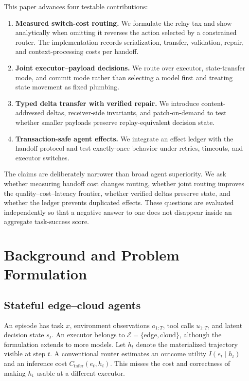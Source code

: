 \documentclass[10pt]{article}
\begin{document}
This paper advances four testable contributions:
\begin{enumerate}
  \item \textbf{Measured switch-cost routing.} We formulate the relay tax and
  show analytically when omitting it reverses the action selected by a
  constrained router. The implementation records serialization, transfer,
  validation, repair, and context-processing costs per handoff.
  \item \textbf{Joint executor--payload decisions.} We route over executor,
  state-transfer mode, and commit mode rather than selecting a model first and
  treating state movement as fixed plumbing.
  \item \textbf{Typed delta transfer with verified repair.} We introduce
  content-addressed deltas, receiver-side invariants, and patch-on-demand to
  test whether smaller payloads preserve replay-equivalent decision state.
  \item \textbf{Transaction-safe agent effects.} We integrate an effect
  ledger with the handoff protocol and test exactly-once behavior under
  retries, timeouts, and executor switches.
\end{enumerate}

The claims are deliberately narrower than broad agent superiority. We ask
whether measuring handoff cost changes routing, whether joint routing improves
the quality--cost--latency frontier, whether verified deltas preserve state,
and whether the ledger prevents duplicated effects. These questions are
evaluated independently so that a negative answer to one does not disappear
inside an aggregate task-success score.

\section{Background and Problem Formulation}
\label{sec:problem}

\subsection{Stateful edge--cloud agents}

An episode has task $x$, environment observations $o_{1:T}$, tool calls
$u_{1:T}$, and latent decision state $s_t$. An executor belongs to
$\mathcal{E}=\{\mathrm{edge},\mathrm{cloud}\}$, although the formulation
extends to more models. Let $h_t$ denote the materialized trajectory visible
at step $t$. A conventional router estimates an outcome utility $I(e_t\mid
h_t)$ and an inference cost $C_{\mathrm{infer}}(e_t,h_t)$. This misses the
cost and correctness of making $h_t$ usable at a different executor.
\end{document}

